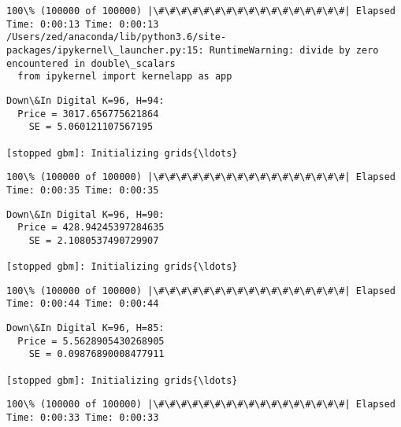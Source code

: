 \documentclass[11pt]{article}
\begin{document}
    \begin{Verbatim}[commandchars=\\\{\}]
100\% (100000 of 100000) |\#\#\#\#\#\#\#\#\#\#\#\#\#\#\#\#\#| Elapsed Time: 0:00:13 Time: 0:00:13
/Users/zed/anaconda/lib/python3.6/site-packages/ipykernel\_launcher.py:15: RuntimeWarning: divide by zero encountered in double\_scalars
  from ipykernel import kernelapp as app

    \end{Verbatim}

    \begin{Verbatim}[commandchars=\\\{\}]
Down\&In Digital K=96, H=94:
  Price = 3017.656775621864
    SE = 5.060121107567195

[stopped gbm]: Initializing grids{\ldots}

    \end{Verbatim}

    \begin{Verbatim}[commandchars=\\\{\}]
100\% (100000 of 100000) |\#\#\#\#\#\#\#\#\#\#\#\#\#\#\#\#\#| Elapsed Time: 0:00:35 Time: 0:00:35

    \end{Verbatim}

    \begin{Verbatim}[commandchars=\\\{\}]
Down\&In Digital K=96, H=90:
  Price = 428.94245397284635
    SE = 2.1080537490729907

[stopped gbm]: Initializing grids{\ldots}

    \end{Verbatim}

    \begin{Verbatim}[commandchars=\\\{\}]
100\% (100000 of 100000) |\#\#\#\#\#\#\#\#\#\#\#\#\#\#\#\#\#| Elapsed Time: 0:00:44 Time: 0:00:44

    \end{Verbatim}

    \begin{Verbatim}[commandchars=\\\{\}]
Down\&In Digital K=96, H=85:
  Price = 5.5628905430268905
    SE = 0.09876890008477911

[stopped gbm]: Initializing grids{\ldots}

    \end{Verbatim}

    \begin{Verbatim}[commandchars=\\\{\}]
100\% (100000 of 100000) |\#\#\#\#\#\#\#\#\#\#\#\#\#\#\#\#\#| Elapsed Time: 0:00:33 Time: 0:00:33

    \end{Verbatim}
\end{document}
